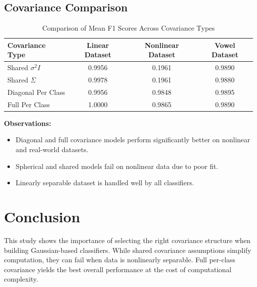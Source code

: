 \documentclass[12pt,a4paper]{article}
\begin{document}








\subsection{Covariance Comparison}

\begin{table}[H]
\centering
\caption{Comparison of Mean F1 Scores Across Covariance Types}
\begin{tabular}{lccc}
\toprule
\textbf{Covariance Type} & \textbf{Linear Dataset} & \textbf{Nonlinear Dataset} & \textbf{Vowel Dataset} \\
\midrule
Shared $\sigma^2 I$     & 0.9956 & 0.1961 & 0.9890 \\
Shared $\Sigma$         & 0.9978 & 0.1961 & 0.9880 \\
Diagonal Per Class      & 0.9956 & 0.9848 & 0.9895 \\
Full Per Class          & 1.0000 & 0.9865 & 0.9890 \\
\bottomrule
\end{tabular}
\end{table}

\textbf{Observations:}
\begin{itemize}
    \item Diagonal and full covariance models perform significantly better on nonlinear and real-world datasets.
    \item Spherical and shared models fail on nonlinear data due to poor fit.
    \item Linearly separable dataset is handled well by all classifiers.
\end{itemize}

\section{Conclusion}

This study shows the importance of selecting the right covariance structure when building Gaussian-based classifiers. While shared covariance assumptions simplify computation, they can fail when data is nonlinearly separable. Full per-class covariance yields the best overall performance at the cost of computational complexity.
\end{document}
